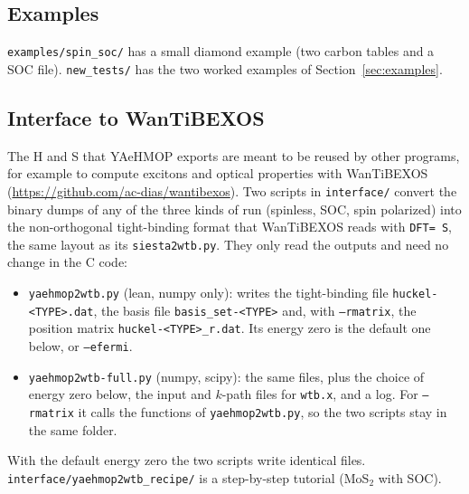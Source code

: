 \documentclass[11pt,a4paper]{article}
\newcommand{\file}[1]{\texttt{#1}}
\newcommand{\opt}[1]{\texttt{#1}}
\begin{document}
\subsection{Examples}

\file{examples/spin\_soc/} has a small diamond example (two carbon tables and a SOC file).
\file{new\_tests/} has the two worked examples of Section~\ref{sec:examples}.

\subsection{Interface to WanTiBEXOS}\label{sec:wtb}

The H and S that YAeHMOP exports are meant to be reused by other programs, for example to
compute excitons and optical properties with WanTiBEXOS
(\url{https://github.com/ac-dias/wantibexos}). Two scripts in \file{interface/} convert the
binary dumps of any of the three kinds of run (spinless, SOC, spin polarized) into the
non-orthogonal tight-binding format that WanTiBEXOS reads with \texttt{DFT= S}, the same
layout as its \file{siesta2wtb.py}. They only read the outputs and need no change in the C
code:
\begin{itemize}
\item \file{yaehmop2wtb.py} (lean, numpy only): writes the tight-binding file
  \file{huckel-<TYPE>.dat}, the basis file \file{basis\_set-<TYPE>} and, with
  \opt{--rmatrix}, the position matrix \file{huckel-<TYPE>\_r.dat}. Its energy zero is the
  default one below, or \opt{--efermi}.
\item \file{yaehmop2wtb-full.py} (numpy, scipy): the same files, plus the choice of energy
  zero below, the input and $k$-path files for \texttt{wtb.x}, and a log. For
  \opt{--rmatrix} it calls the functions of \file{yaehmop2wtb.py}, so the two scripts stay
  in the same folder.
\end{itemize}
With the default energy zero the two scripts write identical files.
\file{interface/yaehmop2wtb\_recipe/} is a step-by-step tutorial (MoS$_2$ with SOC).
\end{document}

